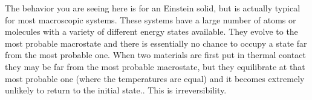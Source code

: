 The behavior you are seeing here is for an Einstein solid, but is actually typical for
most macroscopic systems. These systems have a large number of atoms or molecules
with a variety of different energy states available.
They evolve to the most probable macrostate and there is essentially no chance to occupy a state
far from the most probable one. 
When two materials are first put in thermal contact they may be far from the most probable 
macrostate, but they equilibrate at that most probable one (where the temperatures are equal)
and it becomes extremely unlikely to return to the initial state..
This is irreversibility.












